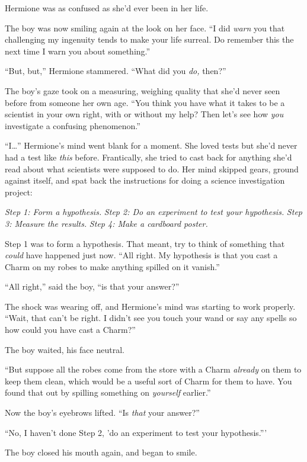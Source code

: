 Hermione was as confused as she'd ever been in her life.

The boy was now smiling again at the look on her face. ``I did
\emph{warn} you that challenging my ingenuity tends to make your life
surreal. Do remember this the next time I warn you about something.''

``But, but,'' Hermione stammered. ``What did you \emph{do,} then?''

The boy's gaze took on a measuring, weighing quality that she'd never
seen before from someone her own age. ``You think you have what it takes
to be a scientist in your own right, with or without my help? Then let's
see how \emph{you} investigate a confusing phenomenon.''

``I\ldots{}'' Hermione's mind went blank for a moment. She loved tests
but she'd never had a test like \emph{this} before. Frantically, she
tried to cast back for anything she'd read about what scientists were
supposed to do. Her mind skipped gears, ground against itself, and spat
back the instructions for doing a science investigation project:

\emph{Step 1: Form a hypothesis.} \emph{Step 2: Do an experiment to test
your hypothesis.} \emph{Step 3: Measure the results.} \emph{Step 4: Make
a cardboard poster.}

Step 1 was to form a hypothesis. That meant, try to think of something
that \emph{could} have happened just now. ``All right. My hypothesis is
that you cast a Charm on my robes to make anything spilled on it
vanish.''

``All right,'' said the boy, ``is that your answer?''

The shock was wearing off, and Hermione's mind was starting to work
properly. ``Wait, that can't be right. I didn't see you touch your wand
or say any spells so how could you have cast a Charm?''

The boy waited, his face neutral.

``But suppose all the robes come from the store with a Charm
\emph{already} on them to keep them clean, which would be a useful sort
of Charm for them to have. You found that out by spilling something on
\emph{yourself} earlier.''

Now the boy's eyebrows lifted. ``Is \emph{that} your answer?''

``No, I haven't done Step 2, 'do an experiment to test your
hypothesis.'''

The boy closed his mouth again, and began to smile.

